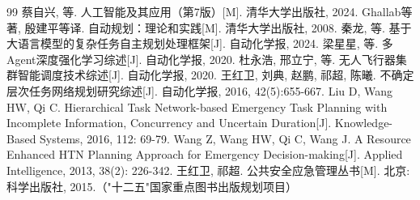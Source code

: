 \documentclass[a4paper,12pt,openany]{ctexbook}
\theoremstyle{definition}
\theoremstyle{plain}
\begin{document}
\begin{thebibliography}{99}
 蔡自兴, 等. 人工智能及其应用（第7版）[M]. 清华大学出版社, 2024.
 Ghallab等著, 殷建平等译. 自动规划：理论和实践[M]. 清华大学出版社, 2008.
 秦龙, 等. 基于大语言模型的复杂任务自主规划处理框架[J]. 自动化学报, 2024.
 梁星星, 等. 多Agent深度强化学习综述[J]. 自动化学报, 2020.
 杜永浩, 邢立宁, 等. 无人飞行器集群智能调度技术综述[J]. 自动化学报, 2020.
 王红卫, 刘典, 赵鹏, 祁超, 陈曦. 不确定层次任务网络规划研究综述[J]. 自动化学报, 2016, 42(5):655-667.
 Liu D, Wang HW, Qi C. Hierarchical Task Network-based Emergency Task Planning with Incomplete Information, Concurrency and Uncertain Duration[J]. Knowledge-Based Systems, 2016, 112: 69-79.
 Wang Z, Wang HW, Qi C, Wang J. A Resource Enhanced HTN Planning Approach for Emergency Decision-making[J]. Applied Intelligence, 2013, 38(2): 226-342.
 王红卫, 祁超. 公共安全应急管理丛书[M]. 北京: 科学出版社, 2015.（"十二五"国家重点图书出版规划项目）

\end{thebibliography}
\end{document}
